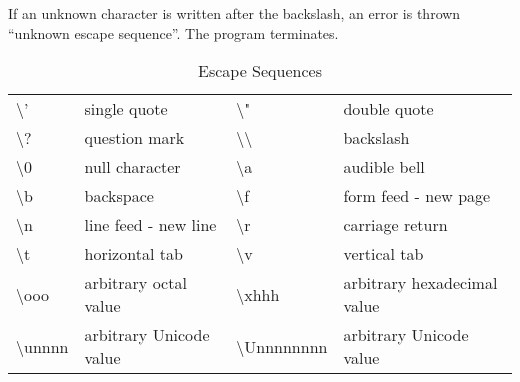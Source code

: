 \documentclass[a4paper]{article}
\begin{document}
If an unknown character is written after the backslash, an error is thrown ``unknown escape sequence''. The program terminates.

\begin{table}[htdp]
\caption{Escape Sequences}
\begin{center}
\begin{tabular}{|ll|ll|}
\textbackslash'	 & single quote	 & \textbackslash"	  &double quote	  \\
\textbackslash?	 & question mark & \textbackslash\textbackslash& backslash	 \\
\textbackslash 0&  null character	& \textbackslash a&	 audible bell	 \\
\textbackslash b&	 backspace	& \textbackslash f	 &form feed - new page \\
\textbackslash n&	 line feed - new line & \textbackslash r	 &carriage return	 \\
\textbackslash t	 &horizontal tab	 & \textbackslash v&	 vertical tab	 \\
\textbackslash ooo&	 arbitrary octal value	  & \textbackslash xhhh	& arbitrary hexadecimal value	 \\
\textbackslash unnnn&	 arbitrary Unicode value & \textbackslash Unnnnnnnn&	 arbitrary Unicode value \\
\end{tabular}
\end{center}
\label{tab:escape}
\end{table}%
\end{document}
